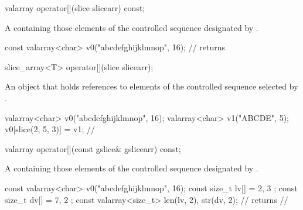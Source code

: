 %
\begin{itemdecl}
valarray operator[](slice slicearr) const;
\end{itemdecl}

\begin{itemdescr}
\pnum
\returns A  containing those
elements of the controlled sequence designated by .
\begin{example}
\begin{codeblock}
const valarray<char> v0("abcdefghijklmnop", 16);
//  returns 
\end{codeblock}
\end{example}
\end{itemdescr}

%
\begin{itemdecl}
slice_array<T> operator[](slice slicearr);
\end{itemdecl}

\begin{itemdescr}
\pnum
\returns An object that holds references to elements of the controlled
sequence selected by . \begin{example}
\begin{codeblock}
valarray<char> v0("abcdefghijklmnop", 16);
valarray<char> v1("ABCDE", 5);
v0[slice(2, 5, 3)] = v1;
// 
\end{codeblock}
\end{example}
\end{itemdescr}

%
\begin{itemdecl}
valarray operator[](const gslice& gslicearr) const;
\end{itemdecl}

\begin{itemdescr}
\pnum
\returns A  containing those
elements of the controlled sequence designated by .
\begin{example}
\begin{codeblock}
const valarray<char> v0("abcdefghijklmnop", 16);
const size_t lv[] = { 2, 3 };
const size_t dv[] = { 7, 2 };
const valarray<size_t> len(lv, 2), str(dv, 2);
//  returns
// 
\end{codeblock}
\end{example}
\end{itemdescr}


